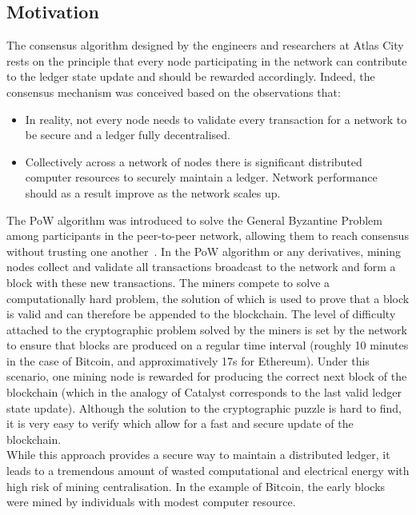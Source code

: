 \subsection{Motivation}\label{subsec:mot}
The consensus algorithm designed by the engineers and researchers at Atlas City rests on the principle that every node participating in the network can contribute to the ledger state update and should be rewarded accordingly. Indeed, the consensus mechanism was conceived based on the observations that: 
\begin{itemize}
\item In reality, not every node needs to validate every transaction for a network to be secure and a ledger fully decentralised. 
\item Collectively across a network of nodes there is significant distributed computer resources to securely maintain a ledger. Network performance should as a result improve as the network scales up.
\end{itemize}

The PoW algorithm was introduced to solve the General Byzantine Problem among participants in the peer-to-peer network, allowing them to reach consensus without trusting one another~\cite{BFT}. In the PoW algorithm or any derivatives, mining nodes collect and validate all transactions broadcast to the network and form a block with these new transactions. The miners compete to solve a computationally hard problem, the solution of which is used to prove that a block is valid and can therefore be appended to the blockchain. The level of difficulty attached to the cryptographic problem solved by the miners is set by the network to ensure that blocks are produced on a regular time interval (roughly 10 minutes in the case of Bitcoin, and approximatively 17s for Ethereum). Under this scenario, one mining node is rewarded for producing the correct next block of the blockchain (which in the analogy of Catalyst corresponds to the last valid ledger state update). Although the solution to the cryptographic puzzle is hard to find, it is very easy to verify which allow for a fast and secure update of the blockchain. \\

While this approach provides a secure way to maintain a distributed ledger, it leads to a tremendous amount of wasted computational and electrical energy with high risk of mining centralisation. In the example of Bitcoin, the early blocks were mined by individuals with modest computer resource. 

